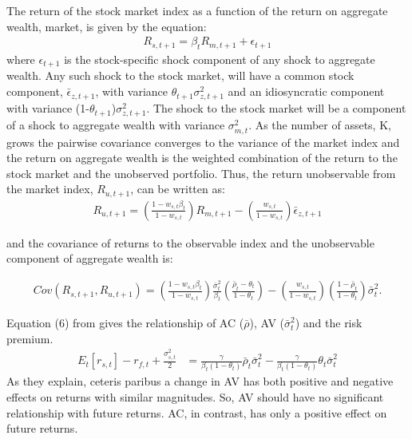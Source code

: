 The return of the stock market index as a function of the return on aggregate wealth, market, is given by the equation:
\begin{align*}
R_{s,t+1} = \beta_{t}R_{m,t+1} + \epsilon_{t+1}
\end{align*}
where $\epsilon_{t+1}$ is the stock-specific shock component of any shock to aggregate wealth. Any such shock to the stock market, will have a common stock component, $\bar{\epsilon}_{z,t+1}$, with variance $\theta_{t+1}\sigma^{2}_{z,t+1}$ and an idiosyncratic component with variance (1-$\theta_{t+1}$)$\sigma^{2}_{z,t+1}$. The shock to the stock market will be a component of a shock to aggregate wealth with variance $\sigma^{2}_{m,t}$. As the number of assets, K, grows the pairwise covariance converges to the variance of the market index and the return on aggregate wealth is the weighted combination of the return to the stock market and the unobserved portfolio. Thus, the return unobservable from the market index, $R_{u,t+1}$, can be written as:
\begin{align*}
	R_{u,t+1} = \left(\frac{1-w_{s,t}\beta_{t}}{1-w_{s,t}}\right)R_{m,t+1} - \left(\frac{w_{s,t}}{1-w_{s,t}}\right)\bar{\epsilon}_{z,t+1}
\end{align*}

and the covariance of returns to the observable index and the unobservable component of aggregate wealth is:

\begin{align*}
	Cov(R_{s,t+1},R_{u,t+1}) = \left(\frac{1-w_{s,t}\beta_{t}}{1-w_{s,t}}\right)\frac{\bar{\sigma}^{2}_{t}}{\beta_{t}}\left(\frac{\bar{\rho}_{t}-\theta_{t}}{1-\theta_{t}}\right) - \left(\frac{w_{s,t}}{1-w_{s,t}}\right)\left(\frac{1-\bar{\rho}_{t}}{1-\theta_{t}}\right)\bar{\sigma}^{2}_{t}.
\end{align*}


Equation (6) from \citet{pollet_average_2010} gives the relationship of AC ($\bar{\rho}$), AV ($\bar{\sigma}^{2}_{t}$) and the risk premium.
\begin{align*}
	E_{t}[r_{s,t}] - r_{f,t} + \frac{\sigma^{2}_{s,t}}{2} &= \frac{\gamma}{\beta_{t}(1-\theta_{t})}\bar{\rho}_{t}\bar{\sigma}^{2}_{t} - \frac{\gamma}{\beta_{t}(1-\theta_{t})}\theta_{t}\bar{\sigma}^{2}_{t}
\end{align*}
As they explain, ceteris paribus a change in AV has both positive and negative effects on returns with similar magnitudes. So, AV should have no significant relationship with future returns. AC, in contrast, has only a positive effect on future returns.

